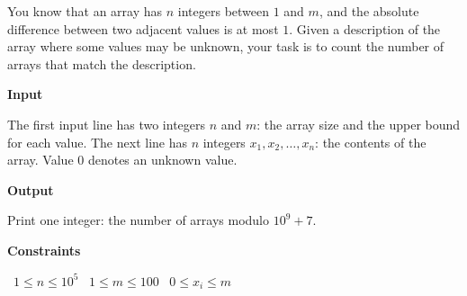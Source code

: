You know that an array has $n$ integers between $1$ and  $m$, and the absolute difference between two adjacent values is at most $1$.
Given a description of the array where some values may be unknown, your task is to count the number of arrays that match the description.

\vspace{0.3cm}\noindent\textbf{Input}

The first input line has two integers $n$ and $m$: the array size and the upper bound for each value.
The next line has $n$ integers $x_1,x_2,\dots,x_n$: the contents of the array. Value $0$ denotes an unknown value.

\vspace{0.3cm}\noindent\textbf{Output}

Print one integer: the number of arrays modulo $10^9+7$.

\vspace{0.3cm}\noindent\textbf{Constraints}

\textbullet\ $1 \le n \le 10^5$
\textbullet\ $1 \le m \le 100$
\textbullet\ $0 \le x_i \le m$